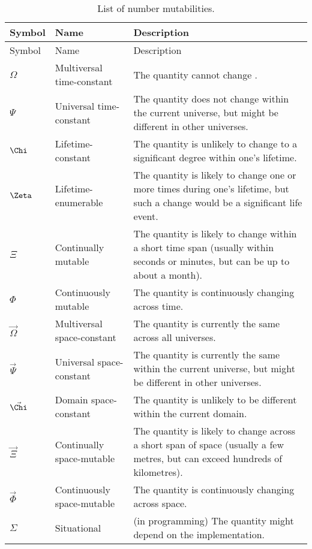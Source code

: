 \documentclass{book}
\begin{document}
\begin{longtabu} to \linewidth{llY}
  \caption{List of number mutabilities.} \\
  
  Symbol & Name & Description \\
  \hline
  \endfirsthead
  
  Symbol & Name & Description \\
  \hline
  \endhead
  
  \endfoot
  
  \endlastfoot

  $\Omega$ & Multiversal time-constant & The quantity cannot change . \\
  $\Psi$ & Universal time-constant & The quantity does not change within the current universe, but might be different in other universes. \\
  $\Chi$ & Lifetime-constant & The quantity is unlikely to change to a significant degree within one's lifetime. \\
  $\Zeta$ & Lifetime-enumerable & The quantity is likely to change one or more times during one's lifetime, but such a change would be a significant life event. \\
  $\Xi$ & Continually mutable & The quantity is likely to change within a short time span (usually within seconds or minutes, but can be up to about a month). \\
  $\Phi$ & Continuously mutable & The quantity is continuously changing across time. \\
  $\vec{\Omega}$ & Multiversal space-constant & The quantity is currently the same across all universes. \\
  $\vec{\Psi}$ & Universal space-constant & The quantity is currently the same within the current universe, but might be different in other universes. \\
  $\vec{\Chi}$ & Domain space-constant & The quantity is unlikely to be different within the current domain. \\
  $\vec{\Xi}$ & Continually space-mutable & The quantity is likely to change across a short span of space (usually a few metres, but can exceed hundreds of kilometres). \\
  $\vec{\Phi}$ & Continuously space-mutable & The quantity is continuously changing across space. \\
  $\Sigma$ & Situational & (in programming) The quantity might depend on the implementation. \\
\end{longtabu}
\end{document}
